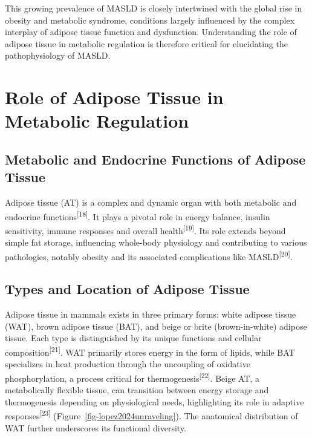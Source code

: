 \documentclass[
  11pt,
  letterpaper,
]{book}
\begin{document}
This growing prevalence of MASLD is closely intertwined with the global
rise in obesity and metabolic syndrome, conditions largely influenced by
the complex interplay of adipose tissue function and dysfunction.
Understanding the role of adipose tissue in metabolic regulation is
therefore critical for elucidating the pathophysiology of MASLD.

\section{Role of Adipose Tissue in Metabolic
Regulation}\label{role-of-adipose-tissue-in-metabolic-regulation}

\subsection{Metabolic and Endocrine Functions of Adipose
Tissue}\label{metabolic-and-endocrine-functions-of-adipose-tissue}

Adipose tissue (AT) is a complex and dynamic organ with both metabolic
and endocrine functions\textsuperscript{{[}18{]}}. It plays a pivotal
role in energy balance, insulin sensitivity, immune responses and
overall health\textsuperscript{{[}19{]}}. Its role extends beyond simple
fat storage, influencing whole-body physiology and contributing to
various pathologies, notably obesity and its associated complications
like MASLD\textsuperscript{{[}20{]}}.

\subsection{Types and Location of Adipose
Tissue}\label{types-and-location-of-adipose-tissue}

Adipose tissue in mammals exists in three primary forms: white adipose
tissue (WAT), brown adipose tissue (BAT), and beige or brite
(brown-in-white) adipose tissue. Each type is distinguished by its
unique functions and cellular composition\textsuperscript{{[}21{]}}. WAT
primarily stores energy in the form of lipids, while BAT specializes in
heat production through the uncoupling of oxidative phosphorylation, a
process critical for thermogenesis\textsuperscript{{[}22{]}}. Beige AT,
a metabolically flexible tissue, can transition between energy storage
and thermogenesis depending on physiological needs, highlighting its
role in adaptive responses\textsuperscript{{[}23{]}}
(Figure~\ref{fig-lopez2024unraveling}). The anatomical distribution of
WAT further underscores its functional diversity.
\end{document}
